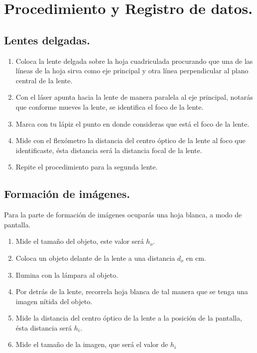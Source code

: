 \documentclass[14pt]{extarticle}
\begin{document}
\section{Procedimiento y Registro de datos.}

\subsection{Lentes delgadas.}

\begin{enumerate}[label=\alph*)]
    \item Coloca la lente delgada sobre la hoja cuadriculada procurando que una de las líneas de la hoja sirva como eje principal y otra línea perpendicular al plano central de la lente.
    \item Con el láser apunta hacia la lente de manera paralela al eje principal, notarás que conforme mueves la lente, se identifica el foco de la lente.
    \item Marca con tu lápiz el punto en donde consideras que está el foco de la lente.
    \item Mide con el flexómetro la distancia del centro óptico de la lente al foco que identificaste, ésta distancia será la distancia focal de la lente.
    \item Repite el procedimiento para la segunda lente.
\end{enumerate}

\subsection{Formación de imágenes.}

Para la parte de formación de imágenes ocuparás una hoja blanca, a modo de pantalla.

\begin{enumerate}[label=\alph*)]
    \item Mide el tamaño del objeto, este valor será $h_{o}$.
    \item Coloca un objeto delante de la lente a una distancia $d_{o}$ en cm.
    \item Ilumina con la lámpara al objeto.
    \item Por detrás de la lente, recorrela hoja blanca de tal manera que se tenga una imagen nítida del objeto.
    \item Mide la distancia del centro óptico de la lente a la posición de la pantalla, ésta distancia será $h_{i}$.
    \item Mide el tamaño de la imagen, que será el valor de $h_{i}$
\end{enumerate}
\end{document}
